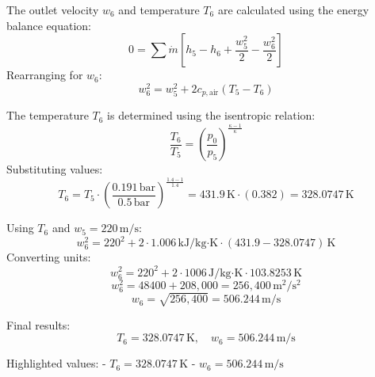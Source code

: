 The outlet velocity \( w_6 \) and temperature \( T_6 \) are calculated using the energy balance equation:  
\[
0 = \sum \dot{m} \left[ h_5 - h_6 + \frac{w_5^2}{2} - \frac{w_6^2}{2} \right]
\]  
Rearranging for \( w_6 \):  
\[
w_6^2 = w_5^2 + 2 c_{p,\text{air}} (T_5 - T_6)
\]  

The temperature \( T_6 \) is determined using the isentropic relation:  
\[
\frac{T_6}{T_5} = \left( \frac{p_0}{p_5} \right)^{\frac{\kappa - 1}{\kappa}}
\]  
Substituting values:  
\[
T_6 = T_5 \cdot \left( \frac{0.191 \, \text{bar}}{0.5 \, \text{bar}} \right)^{\frac{1.4 - 1}{1.4}} = 431.9 \, \text{K} \cdot (0.382) = 328.0747 \, \text{K}
\]  

Using \( T_6 \) and \( w_5 = 220 \, \text{m/s} \):  
\[
w_6^2 = 220^2 + 2 \cdot 1.006 \, \text{kJ/kg·K} \cdot (431.9 - 328.0747) \, \text{K}
\]  
Converting units:  
\[
w_6^2 = 220^2 + 2 \cdot 1006 \, \text{J/kg·K} \cdot 103.8253 \, \text{K}
\]  
\[
w_6^2 = 48400 + 208,000 = 256,400 \, \text{m}^2/\text{s}^2
\]  
\[
w_6 = \sqrt{256,400} = 506.244 \, \text{m/s}
\]  

Final results:  
\[
T_6 = 328.0747 \, \text{K}, \quad w_6 = 506.244 \, \text{m/s}
\]  

Highlighted values:  
- \( T_6 = 328.0747 \, \text{K} \)  
- \( w_6 = 506.244 \, \text{m/s} \)